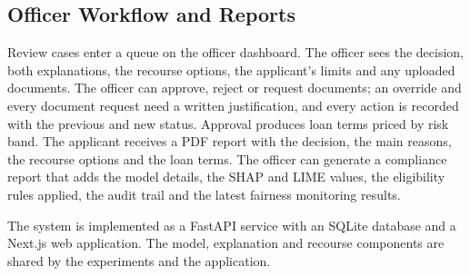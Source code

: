\subsection{Officer Workflow and Reports}
Review cases enter a queue on the officer dashboard. The officer sees the decision, both explanations, the recourse
options, the applicant's limits and any uploaded documents. The officer can approve, reject or request documents; an
override and every document request need a written justification, and every action is recorded with the previous and
new status. Approval produces loan terms priced by risk band. The applicant receives a PDF report with the decision,
the main reasons, the recourse options and the loan terms. The officer can generate a compliance report that adds the
model details, the SHAP and LIME values, the eligibility rules applied, the audit trail and the latest fairness
monitoring results.

The system is implemented as a FastAPI service with an SQLite database and a Next.js web application. The model,
explanation and recourse components are shared by the experiments and the application.
